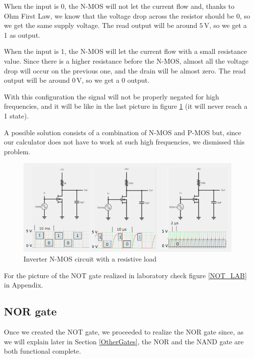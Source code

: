 \documentclass{article}
\begin{document}
When the input is 0, the N-MOS will not let the current flow and, thanks to Ohm First Law, we know that the voltage drop across the resistor should be 0, so we get the same supply voltage. The read output will be around $5\,\textrm{V}$, so we get a 1 as output.

\vspace{3mm}

When the input is 1, the N-MOS will let the current flow with a small resistance value. Since there is a higher resistance before the N-MOS, almost all the voltage drop will occur on the previous one, and the drain will be almost zero. The read output will be around $0\,\textrm{V}$, so we get a 0 output.

\vspace{3mm}

With this configuration the signal will not be properly negated for high frequencies, and it will be like in the last picture in figure \ref{ResistiveInverter} (it will never reach a 1 state).

A possible solution consists of a combination of N-MOS and P-MOS but, since our calculator does not have to work at such high frequencies, we dismissed this problem.

\begin{figure}[h]
    \centering
    \includegraphics[scale=0.6]{IM_inverter_esa.PNG}
    \caption{Inverter N-MOS circuit with a resistive load}
    \label{ResistiveInverter}
\end{figure}

For the picture of the NOT gate realized in laboratory check figure \ref{NOT_LAB} in Appendix.


\clearpage
\subsection{NOR gate}

Once we created the NOT gate, we proceeded to realize the NOR gate since, as we will explain later in Section \ref{OtherGates}, the NOR and the NAND gate are both functional complete.
\end{document}

